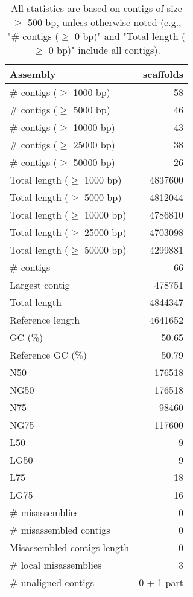 \documentclass[12pt,a4paper]{article}
\begin{document}
\begin{table}[ht]
\begin{center}
\caption{All statistics are based on contigs of size $\geq$ 500 bp, unless otherwise noted (e.g., "\# contigs ($\geq$ 0 bp)" and "Total length ($\geq$ 0 bp)" include all contigs).}
\begin{tabular}{|l*{1}{|r}|}
\hline
Assembly & scaffolds \\ \hline
\# contigs ($\geq$ 1000 bp) & 58 \\ \hline
\# contigs ($\geq$ 5000 bp) & 46 \\ \hline
\# contigs ($\geq$ 10000 bp) & 43 \\ \hline
\# contigs ($\geq$ 25000 bp) & 38 \\ \hline
\# contigs ($\geq$ 50000 bp) & 26 \\ \hline
Total length ($\geq$ 1000 bp) & 4837600 \\ \hline
Total length ($\geq$ 5000 bp) & 4812044 \\ \hline
Total length ($\geq$ 10000 bp) & 4786810 \\ \hline
Total length ($\geq$ 25000 bp) & 4703098 \\ \hline
Total length ($\geq$ 50000 bp) & 4299881 \\ \hline
\# contigs & 66 \\ \hline
Largest contig & 478751 \\ \hline
Total length & 4844347 \\ \hline
Reference length & 4641652 \\ \hline
GC (\%) & 50.65 \\ \hline
Reference GC (\%) & 50.79 \\ \hline
N50 & 176518 \\ \hline
NG50 & 176518 \\ \hline
N75 & 98460 \\ \hline
NG75 & 117600 \\ \hline
L50 & 9 \\ \hline
LG50 & 9 \\ \hline
L75 & 18 \\ \hline
LG75 & 16 \\ \hline
\# misassemblies & 0 \\ \hline
\# misassembled contigs & 0 \\ \hline
Misassembled contigs length & 0 \\ \hline
\# local misassemblies & 3 \\ \hline
\# unaligned contigs & 0 + 1 part \\ \hline

\end{tabular}
\end{center}
\end{table}
\end{document}
